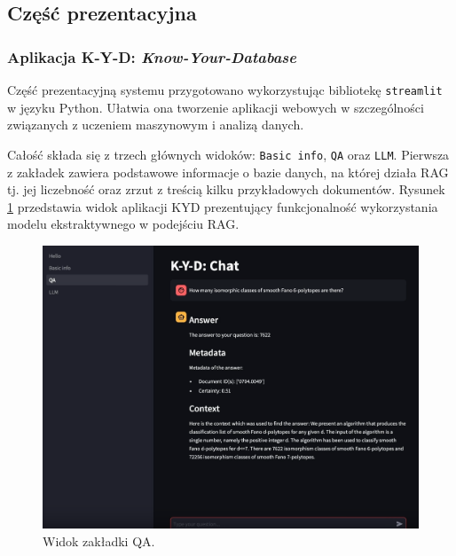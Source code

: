 \documentclass[10pt]{article}
\begin{document}
\subsection{Część prezentacyjna}

\subsubsection{Aplikacja K-Y-D: \emph{Know-Your-Database}}

Część prezentacyjną systemu przygotowano wykorzystując bibliotekę \texttt{streamlit} w języku Python. Ułatwia ona tworzenie aplikacji webowych w szczególności związanych z uczeniem maszynowym i analizą danych.  

Całość składa się z trzech głównych widoków: \texttt{Basic info}, \texttt{QA} oraz \texttt{LLM}. Pierwsza z zakładek zawiera podstawowe informacje o bazie danych, na której działa RAG tj. jej liczebność oraz zrzut z treścią kilku przykładowych dokumentów. Rysunek \ref{fig:qa} przedstawia widok aplikacji KYD prezentujący funkcjonalność wykorzystania modelu ekstraktywnego w podejściu RAG.

\begin{figure}[h]
    \centering
    \includegraphics[width=1.0\textwidth]{images/QA-view.png}
    \caption{Widok zakładki QA.}
    \label{fig:qa}
\end{figure}
\end{document}
